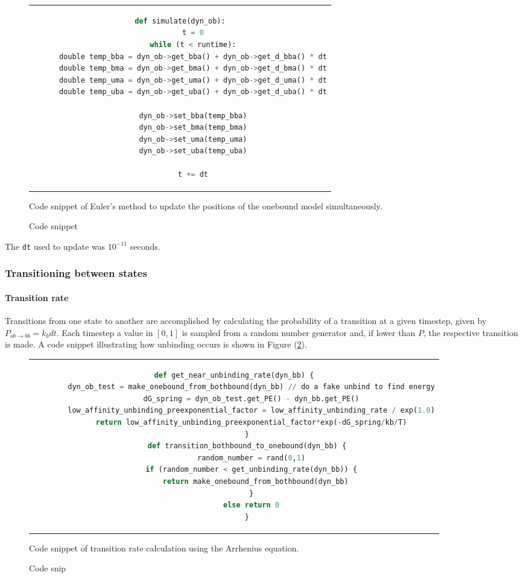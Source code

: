 \documentclass[10pt]{article} %
\begin{document}
\begin{figure}[h!]
  \centering
  \begin{tabular}{c}
    \begin{lstlisting}[language=python]
      def simulate(dyn_ob):
      t = 0
      while (t < runtime):
      double temp_bba = dyn_ob->get_bba() + dyn_ob->get_d_bba() * dt
      double temp_bma = dyn_ob->get_bma() + dyn_ob->get_d_bma() * dt
      double temp_uma = dyn_ob->get_uma() + dyn_ob->get_d_uma() * dt
      double temp_uba = dyn_ob->get_uba() + dyn_ob->get_d_uba() * dt

      dyn_ob->set_bba(temp_bba)
      dyn_ob->set_bma(temp_bma)
      dyn_ob->set_uma(temp_uma)
      dyn_ob->set_uba(temp_uba)

      t += dt
    \end{lstlisting}
  \end{tabular}
  \caption{Code snippet}{Code snippet of Euler's method to update the positions of the onebound model simultaneously.}
  \label{ob_struct}
\end{figure}

The \verb|dt| used to update was $10^{-11}$ seconds.

\subsubsection{Transitioning between states}

\paragraph{Transition rate}
\label{sec:transitioning-states}
Transitions from one state to another are accomplished by calculating the probability of a transition at a given timestep, given by $P_{ob\rightarrow bb} = k_bdt$. Each timestep a value in $[0,1]$ is sampled from a random number generator and, if lower than $P$, the respective transition is made. A code snippet illustrating how unbinding occurs is shown in Figure (\ref{transition-rate-snippet}).

\begin{figure}[h!]
  \begin{tabular}{c}
    \begin{lstlisting}[language=python]
      def get_near_unbinding_rate(dyn_bb) {
        dyn_ob_test = make_onebound_from_bothbound(dyn_bb) // do a fake unbind to find energy
        dG_spring = dyn_ob_test.get_PE() - dyn_bb.get_PE()
        low_affinity_unbinding_preexponential_factor = low_affinity_unbinding_rate / exp(1.0)
        return low_affinity_unbinding_preexponential_factor*exp(-dG_spring/kb/T)
      }
      def transition_bothbound_to_onebound(dyn_bb) {
        random_number = rand(0,1)
        if (random_number < get_unbinding_rate(dyn_bb)) {
          return make_onebound_from_bothbound(dyn_bb)
        }
        else return 0
      }
    \end{lstlisting}
  \end{tabular}
  \caption{Code snip}{Code snippet of transition rate calculation using the Arrhenius equation.}
  \label{transition-rate-snippet}
\end{figure}
\end{document}
